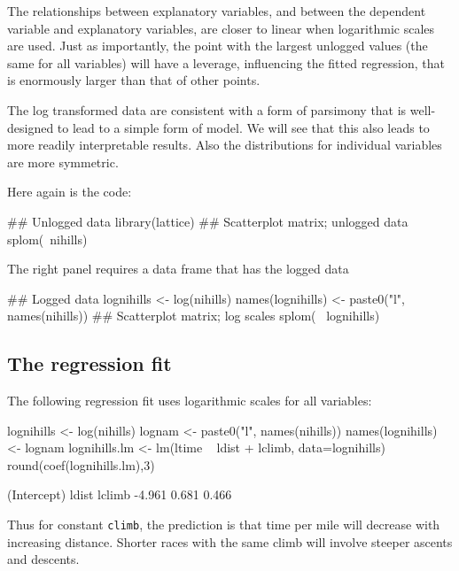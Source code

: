 \documentclass{tufte-book}\usepackage[]{graphicx}\usepackage[]{color}
\newcommand{\txtt}[1]{\texttt{#1}}
\begin{document}
The relationships between explanatory variables, and between the
dependent variable and explanatory variables, are closer to linear
when logarithmic scales are used.  Just as importantly, the point with
the largest unlogged values (the same for all variables) will have a
leverage, influencing the fitted regression, that is enormously larger
than that of other points.

The log transformed data are consistent with a form of parsimony that
is well-designed to lead to a simple form of model. We will see that
this also leads to more readily interpretable results.  Also the
distributions for individual variables are more symmetric.

Here again is the code:
\begin{Schunk}
\begin{Sinput}
## Unlogged data
library(lattice)
## Scatterplot matrix; unlogged data
splom(~nihills)
\end{Sinput}
\end{Schunk}

The right panel requires a data frame that has the logged data
\begin{Schunk}
\begin{Sinput}
## Logged data
lognihills <- log(nihills)
names(lognihills) <- paste0("l", names(nihills))
## Scatterplot matrix; log scales
splom(~ lognihills)
\end{Sinput}
\end{Schunk}

\subsection{The regression fit}

The following regression fit uses logarithmic scales for
all variables:

\begin{Schunk}
\begin{Sinput}
lognihills <- log(nihills)
lognam <- paste0("l", names(nihills))
names(lognihills) <- lognam
lognihills.lm <- lm(ltime ~ ldist + lclimb,
                    data=lognihills)
round(coef(lognihills.lm),3)
\end{Sinput}
\begin{Soutput}
(Intercept)       ldist      lclimb 
     -4.961       0.681       0.466 
\end{Soutput}
\end{Schunk}
\noindent
Thus for constant \txtt{climb}, the prediction is that time per mile
will decrease with increasing distance. Shorter races with the same climb
will involve steeper ascents and descents.
\end{document}
